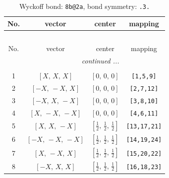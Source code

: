 \documentclass[fleqn,8pt]{jsarticle}
\begin{document}
\begin{longtable}{cccc}
\caption{Wyckoff bond: {\tt 8b@2a}, bond symmetry: {\tt .3.}}
 \\
 \hline \hline
No. & vector & center & mapping \\ \hline \endfirsthead

\multicolumn{3}{l}{\tablename\ \thetable{}} \\
 \hline \hline
No. & vector & center & mapping \\ \hline \endhead

 \hline \hline
\multicolumn{3}{r}{\footnotesize\it continued ...} \\ \endfoot

 \hline \hline
\multicolumn{3}{r}{} \\ \endlastfoot

1 & $\left[ X,\, X,\, X \right]$ & $\left[ 0,\, 0,\, 0 \right]$ & {\tt [1,5,9]} \\ \hline
2 & $\left[ - X,\, - X,\, X \right]$ & $\left[ 0,\, 0,\, 0 \right]$ & {\tt [2,7,12]} \\ \hline
3 & $\left[ - X,\, X,\, - X \right]$ & $\left[ 0,\, 0,\, 0 \right]$ & {\tt [3,8,10]} \\ \hline
4 & $\left[ X,\, - X,\, - X \right]$ & $\left[ 0,\, 0,\, 0 \right]$ & {\tt [4,6,11]} \\ \hline
5 & $\left[ X,\, X,\, - X \right]$ & $\left[ \frac{1}{2},\, \frac{1}{2},\, \frac{1}{2} \right]$ & {\tt [13,17,21]} \\ \hline
6 & $\left[ - X,\, - X,\, - X \right]$ & $\left[ \frac{1}{2},\, \frac{1}{2},\, \frac{1}{2} \right]$ & {\tt [14,19,24]} \\ \hline
7 & $\left[ X,\, - X,\, X \right]$ & $\left[ \frac{1}{2},\, \frac{1}{2},\, \frac{1}{2} \right]$ & {\tt [15,20,22]} \\ \hline
8 & $\left[ - X,\, X,\, X \right]$ & $\left[ \frac{1}{2},\, \frac{1}{2},\, \frac{1}{2} \right]$ & {\tt [16,18,23]} \\
\end{longtable}
\renewcommand{\arraystretch}{1.2}
\end{document}
